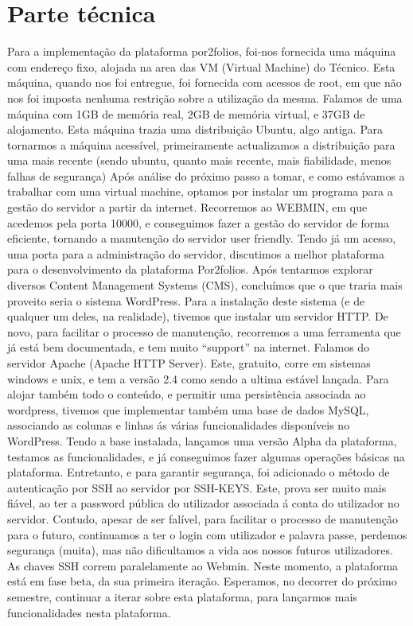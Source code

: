 \documentclass[a4paper,12pt,journal,twoside,compsoc]{PPIEEEtran}
\begin{document}
\section{Parte técnica}
Para a implementação da plataforma por2folios, foi-nos fornecida uma máquina com endereço fixo, alojada na area das 
VM (Virtual Machine) do Técnico. Esta máquina, quando nos foi entregue, foi fornecida com acessos de root, em que não nos foi 
imposta nenhuma restrição sobre a utilização da mesma.
Falamos de uma máquina com 1GB de memória real, 2GB de memória virtual, e 37GB de alojamento.
Esta máquina trazia uma distribuição Ubuntu, algo antiga.
Para tornarmos a máquina acessível, primeiramente actualizamos a distribuição para uma mais recente (sendo ubuntu, quanto mais recente, mais fiabilidade, menos falhas de segurança)
Após análise do próximo passo a tomar, e como estávamos a trabalhar com uma virtual machine, optamos por instalar um programa para a gestão do servidor a partir da internet. Recorremos ao WEBMIN, em que acedemos pela porta 10000, e conseguimos fazer a gestão do servidor de forma eficiente, tornando a manutenção do servidor user friendly.
Tendo já um acesso, uma porta para a administração do servidor, discutimos a melhor plataforma para o desenvolvimento da plataforma Por2folios. Após tentarmos explorar diversos Content Management Systems (CMS), concluímos que o que traria mais proveito seria o sistema WordPress. Para a instalação deste sistema (e de qualquer um deles, na realidade), tivemos que instalar um servidor HTTP. De novo, para facilitar o processo de manutenção, recorremos a uma ferramenta que já está bem documentada, e tem muito “support” na internet. Falamos do servidor Apache (Apache HTTP Server). Este, gratuito, corre em sistemas windows e unix, e tem a versão 2.4 como sendo a ultima estável lançada.
Para alojar também todo o conteúdo, e permitir uma persistência associada ao wordpress, tivemos que implementar também uma base de dados MySQL, associando as colunas e linhas ás várias funcionalidades disponíveis no WordPress.
Tendo a base instalada, lançamos uma versão Alpha da plataforma, testamos as funcionalidades, e já conseguimos fazer algumas operações básicas na plataforma.
Entretanto, e para garantir segurança, foi adicionado o método de autenticação por SSH ao servidor por SSH-KEYS. Este, prova ser muito mais fiável, ao ter a password pública do utilizador associada á conta do utilizador no servidor. Contudo, apesar de ser falível, para facilitar o processo de manutenção para o futuro, continuamos a ter o login com utilizador e palavra passe, perdemos segurança (muita), mas não dificultamos a vida aos nossos futuros utilizadores.
As chaves SSH correm paralelamente ao Webmin.
Neste momento, a plataforma está em fase beta, da sua primeira iteração. Esperamos, no decorrer do próximo semestre, continuar a iterar sobre esta plataforma, para lançarmos mais funcionalidades nesta plataforma.
\end{document}

